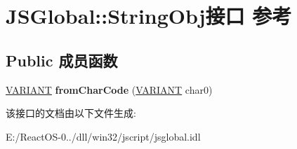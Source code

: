 \hypertarget{interface_j_s_global_1_1_string_obj}{}\section{J\+S\+Global\+:\+:String\+Obj接口 参考}
\label{interface_j_s_global_1_1_string_obj}
\subsection*{Public 成员函数}
\begin{DoxyCompactItemize}
\item 
\mbox{\label{interface_j_s_global_1_1_string_obj_a5f79b5f565fb40eb679f4c6b07045e8b}} 
\hyperlink{structtag_v_a_r_i_a_n_t}{V\+A\+R\+I\+A\+NT} {\bfseries from\+Char\+Code} (\hyperlink{structtag_v_a_r_i_a_n_t}{V\+A\+R\+I\+A\+NT} char0)
\end{DoxyCompactItemize}


该接口的文档由以下文件生成\+:\begin{DoxyCompactItemize}
\item 
E\+:/\+React\+O\+S-\/0../dll/win32/jscript/jsglobal.\+idl\end{DoxyCompactItemize}
